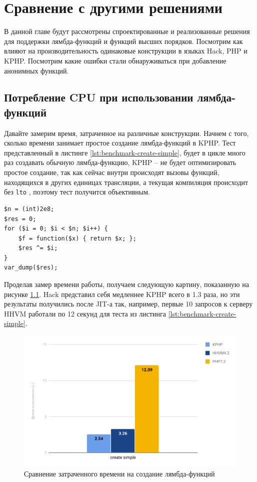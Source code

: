 
\chapter{Сравнение с другими решениями}
\label{sec:comparision}
В данной главе будут рассмотрены спроектированные и реализованные решения для поддержки лямбда-функций и функций высших порядков.
Посмотрим как влияют на производительность одинаковые конструкции в языках Hack, PHP и KPHP.
Посмотрим какие ошибки стали обнаруживаться при добавление анонимных функций.

\section{Потребление CPU при использовании лямбда-функций}
Давайте замерим время, затраченное на различные конструкции.
Начнем с того, сколько времени занимает простое создание лямбда-функций в KPHP.
Тест представленный в листинге \ref{lst:benchmark-create-simple}, будет в цикле много раз создавать обычную лямбда-функцию, KPHP -- не будет оптимизировать простое создание, так как сейчас внутри происходят вызовы функций, находящихся в других единицах трансляции, а текущая компиляция происходит без \verb|lto| \cite{lto}, поэтому тест получится объективным.
\begin{lstlisting}[caption={Бенчмарк создания анонимных функций},label={lst:benchmark-create-simple}]
$n = (int)2e8;
$res = 0;
for ($i = 0; $i < $n; $i++) {
    $f = function($x) { return $x; };
    $res ^= $i;
}
var_dump($res);
\end{lstlisting}

Проделав замер времени работы, получаем следующую картину, показанную на рисунке \ref{fig:benchmark-create-simple}.
Hack представил себя медленнее KPHP всего в 1.3 раза, но эти результаты получились после JIT-а так, например, первые 10 запросов к серверу HHVM работали по 12 секунд для теста из листинга \ref{lst:benchmark-create-simple}.
\begin{figure}[H]
    \caption{Сравнение затраченного времени на создание лямбда-функций}
    \label{fig:benchmark-create-simple}
    \centering
    \includegraphics[width=\linewidth]{images/benchmark_create_simple}
\end{figure}

